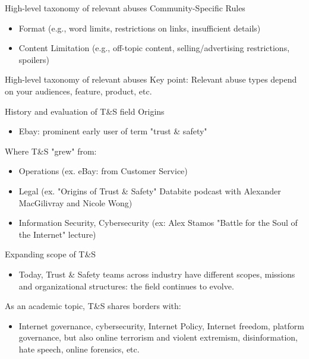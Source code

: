 \documentclass[nobackground,dvipsnames,table]{beamer}
\begin{document}
\begin{frame}{High-level taxonomy of relevant abuses}
	Community-Specific Rules
	\begin{itemize}
		\item Format (e.g., word limits, restrictions on links, insufficient details)
		\item Content Limitation (e.g., off-topic content, selling/advertising restrictions, spoilers)
	\end{itemize}
\end{frame}

\begin{frame}{High-level taxonomy of relevant abuses}
	Key point: Relevant abuse types depend on your audiences, feature, product, etc.
\end{frame}

\begin{frame}{History and evaluation of T\&S field}
	\footnotesize
	Origins
	\begin{itemize}
		\item Ebay: prominent early user of term "trust \& safety"
	\end{itemize}
	Where T\&S "grew" from:
	\begin{itemize}
		\item Operations (ex. eBay: from Customer Service)
		\item Legal (ex. "Origins of Trust \& Safety" Databite podcast with Alexander MacGilivray and Nicole Wong)
		\item Information Security, Cybersecurity (ex: Alex Stamos "Battle for the Soul of the Internet" lecture)
	\end{itemize}
	Expanding scope of T\&S
	\begin{itemize}
		\item Today, Trust \& Safety teams across industry have different scopes, missions and organizational structures: the field continues to evolve.
	\end{itemize}
	As an academic topic, T\&S  shares borders with:
	\begin{itemize}
		\item Internet governance, cybersecurity, Internet Policy,  Internet freedom, platform governance, but also online terrorism and violent extremism, disinformation, hate speech, online forensics, etc.
	\end{itemize}
\end{frame}
\end{document}
